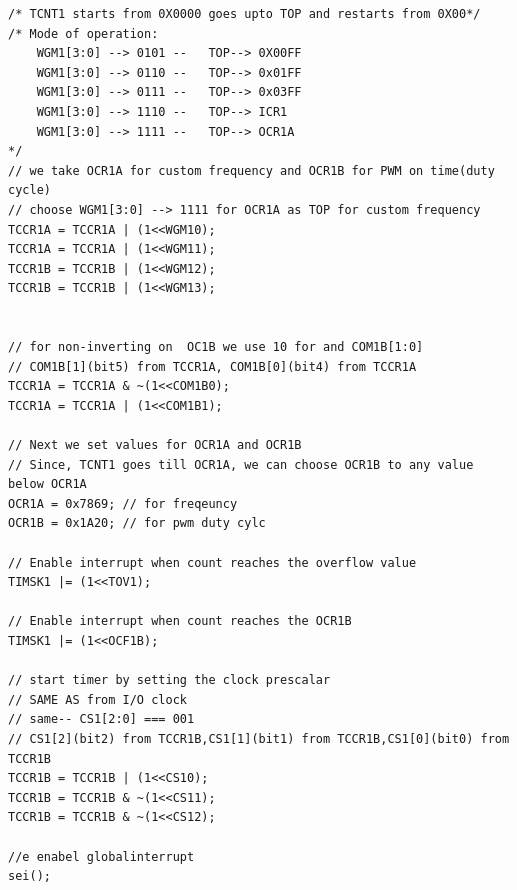\documentclass{article}
\begin{document}
\begin{verbatim}
/* TCNT1 starts from 0X0000 goes upto TOP and restarts from 0X00*/
/* Mode of operation:
    WGM1[3:0] --> 0101 --	TOP--> 0X00FF
    WGM1[3:0] --> 0110 --	TOP--> 0x01FF
    WGM1[3:0] --> 0111 --	TOP--> 0x03FF
    WGM1[3:0] --> 1110 --	TOP--> ICR1
    WGM1[3:0] --> 1111 --	TOP--> OCR1A
*/	
// we take OCR1A for custom frequency and OCR1B for PWM on time(duty cycle)	
// choose WGM1[3:0] --> 1111 for OCR1A as TOP for custom frequency
TCCR1A = TCCR1A | (1<<WGM10);
TCCR1A = TCCR1A | (1<<WGM11);
TCCR1B = TCCR1B | (1<<WGM12);
TCCR1B = TCCR1B | (1<<WGM13);


// for non-inverting on  OC1B we use 10 for and COM1B[1:0]	
// COM1B[1](bit5) from TCCR1A, COM1B[0](bit4) from TCCR1A
TCCR1A = TCCR1A & ~(1<<COM1B0);
TCCR1A = TCCR1A | (1<<COM1B1);

// Next we set values for OCR1A and OCR1B
// Since, TCNT1 goes till OCR1A, we can choose OCR1B to any value below OCR1A
OCR1A = 0x7869; // for freqeuncy
OCR1B = 0x1A20; // for pwm duty cylc

// Enable interrupt when count reaches the overflow value
TIMSK1 |= (1<<TOV1);

// Enable interrupt when count reaches the OCR1B
TIMSK1 |= (1<<OCF1B);

// start timer by setting the clock prescalar
// SAME AS from I/O clock
// same-- CS1[2:0] === 001
// CS1[2](bit2) from TCCR1B,CS1[1](bit1) from TCCR1B,CS1[0](bit0) from TCCR1B
TCCR1B = TCCR1B | (1<<CS10);
TCCR1B = TCCR1B & ~(1<<CS11);
TCCR1B = TCCR1B & ~(1<<CS12);

//e enabel globalinterrupt
sei();
\end{verbatim}
\end{document}
